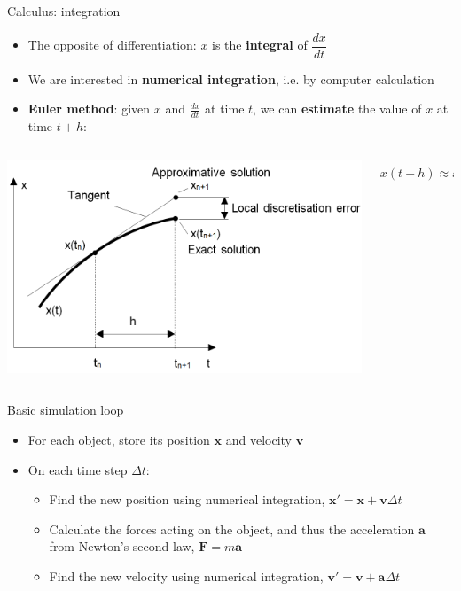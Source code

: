 \begin{frame}{Calculus: integration}
	\begin{itemize}
		\pause\item The opposite of differentiation: $x$ is the \textbf{integral} of $\dfrac{dx}{dt}$
		\pause\item We are interested in \textbf{numerical integration}, i.e. by computer calculation
		\pause\item \textbf{Euler method}: given $x$ and $\frac{dx}{dt}$ at time $t$, we can \textbf{estimate} the value of $x$ at time $t+h$:
	\end{itemize}
	\begin{columns}
		\begin{column}{0.58\textwidth}
			\pause\includegraphics[width=\textwidth]{euler_method}
		\end{column}
		\begin{column}{0.4\textwidth}
			\pause $$ x(t+h) \approx x(t) + h \times \frac{dx}{dt}(t) $$
		\end{column}
	\end{columns}
\end{frame}

\begin{frame}{Basic simulation loop}
	\begin{itemize}
		\pause\item For each object, store its position $\boldsymbol{x}$ and velocity $\boldsymbol{v}$
		\pause\item On each time step $\Delta{t}$:
		\begin{itemize}
			\pause\item Find the new position using numerical integration, $\boldsymbol{x}' = \boldsymbol{x} + $$\boldsymbol{v}\Delta{t}$
			\pause\item Calculate the forces acting on the object, and thus the acceleration $\boldsymbol{a}$ from Newton's second law, $\boldsymbol{F} = m\boldsymbol{a}$
			\pause\item Find the new velocity using numerical integration, $\boldsymbol{v}' = \boldsymbol{v} + $$\boldsymbol{a}\Delta{t}$
		\end{itemize}
	\end{itemize}
\end{frame}

